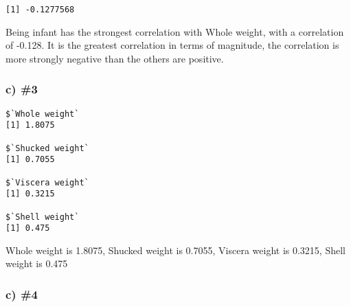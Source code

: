 \documentclass[
  letterpaper,
  DIV=11,
  numbers=noendperiod]{scrartcl}
\newenvironment{Shaded}{\begin{snugshade}}{\end{snugshade}}
\newcommand{\CommentTok}[1]{\textcolor[rgb]{0.37,0.37,0.37}{#1}}
\newcommand{\FunctionTok}[1]{\textcolor[rgb]{0.28,0.35,0.67}{#1}}
\newcommand{\NormalTok}[1]{\textcolor[rgb]{0.00,0.23,0.31}{#1}}
\newcommand{\OtherTok}[1]{\textcolor[rgb]{0.00,0.23,0.31}{#1}}
\newcommand{\SpecialCharTok}[1]{\textcolor[rgb]{0.37,0.37,0.37}{#1}}
\newcommand{\StringTok}[1]{\textcolor[rgb]{0.13,0.47,0.30}{#1}}
\begin{document}
\begin{verbatim}
[1] -0.1277568
\end{verbatim}

Being infant has the strongest correlation with Whole weight, with a
correlation of -0.128. It is the greatest correlation in terms of
magnitude, the correlation is more strongly negative than the others are
positive.

\subsubsection{c) \#3}\label{c-3}

\begin{Shaded}
\end{Shaded}

\begin{verbatim}
$`Whole weight`
[1] 1.8075

$`Shucked weight`
[1] 0.7055

$`Viscera weight`
[1] 0.3215

$`Shell weight`
[1] 0.475
\end{verbatim}

Whole weight is 1.8075, Shucked weight is 0.7055, Viscera weight is
0.3215, Shell weight is 0.475

\subsubsection{c) \#4}\label{c-4}
\end{document}
